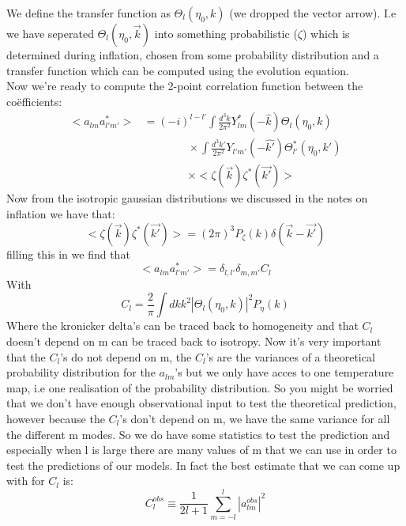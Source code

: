 \documentclass{article}
\begin{document}
We define the transfer function as $\Theta_l(\eta_0,k)$ (we dropped the vector arrow). I.e we have seperated $\Theta_l(\eta_0,\vec{k})$ into something probabilistic ($\zeta$) which is determined during inflation, chosen from some probability distribution and a transfer function which can be computed using the evolution equation.\\
Now we're ready to compute the 2-point correlation function between the coëfficients:
\begin{align}
  <a_{lm}a^*_{l'm'}> &= (-i)^{l-l'}\int \frac{d^3 k}{2\pi^2}Y_{lm}^*(-\hat{k})\Theta_l(\eta_0,k)\\
                     &\qquad\qquad \times   \int \frac{d^3 k'}{2\pi^2}Y_{l'm'}(-\hat{k'})\Theta^*_{l'}(\eta_0,k')\\
                     &\qquad \qquad \times <\zeta(\vec{k})\zeta^*(\vec{k'})>
\end{align}
Now from the isotropic gaussian distributions we discussed in the notes on inflation we have that:
\begin{equation}
  <\zeta(\vec{k})\zeta^*(\vec{k'})> = (2\pi)^3 P_\zeta(k)\delta(\vec{k}-\vec{k'})
\end{equation}
filling this in we find that
\begin{equation}
  <a_{lm}a^*_{l'm'}> = \delta_{l,l'} \delta_{m,m'}C_l
\end{equation}
With
\begin{equation}
  C_l = \frac{2}{\pi}\int dk k^2 \left|\Theta_l(\eta_0,k)\right|^2 P_{\eta}(k)
\end{equation}
Where the kronicker delta's can be traced back to homogeneity and that $C_l$ doesn't depend on m can be traced back to isotropy. Now it's very important that the $C_l$'s do not depend on m, the $C_l$'s are the variances of a theoretical probability distribution for the $a_{lm}$'s but we only have acces to one temperature map, i.e one realisation of the probability distribution. So you might be worried that we don't have enough observational input to test the theoretical prediction, however because the $C_l$'s don't depend on m, we have the same variance for all the different m modes. So we do have some statistics to test the prediction and especially when l is large there are many values of m that we can use in order to test the predictions of our models. In fact the best estimate that we can come up with for $C_l$ is:
\begin{equation}
  C_l^{obs} \equiv \frac{1}{2l + 1} \sum_{m=-l}^l |a_{lm}^{obs}|^2
\end{equation}
\end{document}
